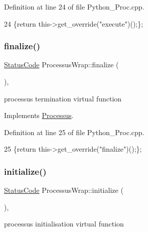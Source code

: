 Definition at line 24 of file Python\+\_\+\+Proc.\+cpp.


\begin{DoxyCode}
24 \{\textcolor{keywordflow}{return} this->get\_override(\textcolor{stringliteral}{"execute"})();\};
\end{DoxyCode}
\mbox{\label{structProcessusWrap_a6be9ef2aaa45c23bc780d264875cc542}} 
\subsubsection{\texorpdfstring{finalize()}{finalize()}}
{\footnotesize\ttfamily \hyperlink{classStatusCode}{Status\+Code} Processus\+Wrap\+::finalize (\begin{DoxyParamCaption}{ }\end{DoxyParamCaption})\hspace{0.3cm}{\ttfamily [inline]}, {\ttfamily [virtual]}}

processus termination virtual function 

Implements \hyperlink{classProcessus_aba93d691f031bdb18ae4b8afb1b2e856}{Processus}.



Definition at line 25 of file Python\+\_\+\+Proc.\+cpp.


\begin{DoxyCode}
25 \{\textcolor{keywordflow}{return} this->get\_override(\textcolor{stringliteral}{"finalize"})();\};
\end{DoxyCode}
\mbox{\label{structProcessusWrap_a7cf48f51e6ac8173255417654cc0b499}} 
\subsubsection{\texorpdfstring{initialize()}{initialize()}}
{\footnotesize\ttfamily \hyperlink{classStatusCode}{Status\+Code} Processus\+Wrap\+::initialize (\begin{DoxyParamCaption}{ }\end{DoxyParamCaption})\hspace{0.3cm}{\ttfamily [inline]}, {\ttfamily [virtual]}}

processus initialisation virtual function 

